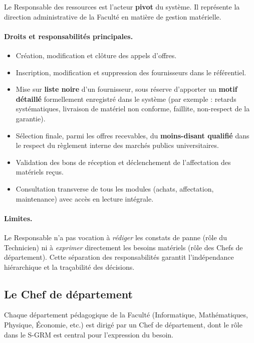 \documentclass[a4paper,11pt,openany]{report}
\begin{document}
Le Responsable des ressources est l'acteur \textbf{pivot} du
système. Il représente la direction administrative de la Faculté
en matière de gestion matérielle.

\paragraph{Droits et responsabilités principales.}
\begin{itemize}
  \item Création, modification et clôture des appels d'offres.
  \item Inscription, modification et suppression des
    fournisseurs dans le référentiel.
  \item Mise sur \textbf{liste noire} d'un fournisseur, sous
    réserve d'apporter un \textbf{motif détaillé} formellement
    enregistré dans le système (par exemple : retards
    systématiques, livraison de matériel non conforme, faillite,
    non-respect de la garantie).
  \item Sélection finale, parmi les offres recevables, du
    \textbf{moins-disant qualifié} dans le respect du règlement
    interne des marchés publics universitaires.
  \item Validation des bons de réception et déclenchement de
    l'affectation des matériels reçus.
  \item Consultation transverse de tous les modules (achats,
    affectation, maintenance) avec accès en lecture intégrale.
\end{itemize}

\paragraph{Limites.} Le Responsable n'a pas vocation à
\emph{rédiger} les constats de panne (rôle du Technicien) ni à
\emph{exprimer} directement les besoins matériels (rôle des Chefs
de département). Cette séparation des responsabilités garantit
l'indépendance hiérarchique et la traçabilité des décisions.

\subsection{Le Chef de département}

Chaque département pédagogique de la Faculté (Informatique,
Mathématiques, Physique, Économie, etc.) est dirigé par un Chef
de département, dont le rôle dans le S-GRM est central pour
l'expression du besoin.
\end{document}

